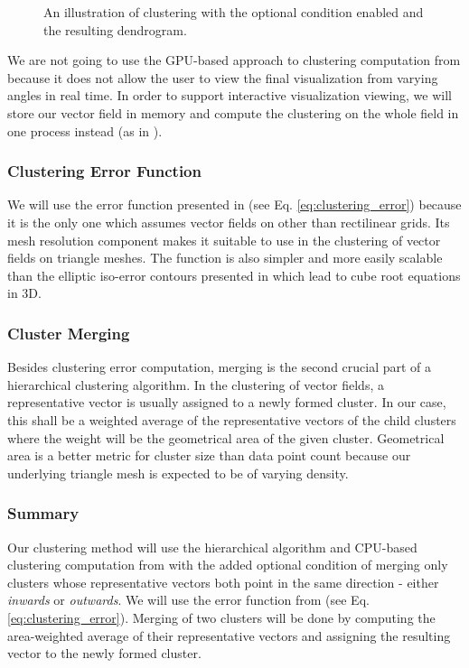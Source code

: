 \begin{figure}[h]
\centering
\def\svgwidth{\textwidth}

\caption[Forest Dendrogram]{An illustration of clustering with the optional condition enabled and the resulting dendrogram.}
\label{fig:forest_dendrogram}
\end{figure}

We are not going to use the GPU-based approach to clustering computation from \citet{Peng12} because it does not allow the user to view the final visualization from varying angles in real time. In order to support interactive visualization viewing, we will store our vector field in memory and compute the clustering on the whole field in one process instead (as in \citet{Telea99}).

\subsubsection{Clustering Error Function}

We will use the error function presented in \citet{Peng12} (see Eq. \ref{eq:clustering_error}) because it is the only one which assumes vector fields on other than rectilinear grids. Its mesh resolution component makes it suitable to use in the clustering of vector fields on triangle meshes. The function is also simpler and more easily scalable than the elliptic iso-error contours presented in \citet{Telea99} which lead to cube root equations in 3D.

\subsubsection{Cluster Merging}

Besides clustering error computation, merging is the second crucial part of a hierarchical clustering algorithm. In the clustering of vector fields, a representative vector is usually assigned to a newly formed cluster. In our case, this shall be a weighted average of the representative vectors of the child clusters where the weight will be the geometrical area of the given cluster. Geometrical area is a better metric for cluster size than data point count because our underlying triangle mesh is expected to be of varying density.

\subsubsection{Summary}

Our clustering method will use the hierarchical algorithm and CPU-based clustering computation from \citet{Telea99} with the added optional condition of merging only clusters whose representative vectors both point in the same direction - either {\it inwards} or {\it outwards}. We will use the error function from \citet{Peng12} (see Eq. \ref{eq:clustering_error}). Merging of two clusters will be done by computing the area-weighted average of their representative vectors and assigning the resulting vector to the newly formed cluster.

